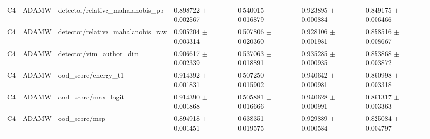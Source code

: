 \begin{longtable}{lllllll}
C4 & ADAMW & detector/relative\_mahalanobis\_pp & 0.898722 $\pm$ 0.002567 & 0.540015 $\pm$ 0.016879 & 0.923895 $\pm$ 0.000884 & 0.849175 $\pm$ 0.006466 \\
C4 & ADAMW & detector/relative\_mahalanobis\_raw & 0.905204 $\pm$ 0.003314 & 0.507806 $\pm$ 0.020360 & 0.928106 $\pm$ 0.001981 & 0.858516 $\pm$ 0.008667 \\
C4 & ADAMW & detector/vim\_author\_dim & 0.906617 $\pm$ 0.002339 & 0.537063 $\pm$ 0.018891 & 0.935285 $\pm$ 0.000935 & 0.853868 $\pm$ 0.003872 \\
C4 & ADAMW & ood\_score/energy\_t1 & 0.914392 $\pm$ 0.001831 & 0.507250 $\pm$ 0.015902 & 0.940642 $\pm$ 0.000981 & 0.860998 $\pm$ 0.003318 \\
C4 & ADAMW & ood\_score/max\_logit & 0.914390 $\pm$ 0.001868 & 0.505881 $\pm$ 0.016666 & 0.940628 $\pm$ 0.000991 & 0.861317 $\pm$ 0.003363 \\
C4 & ADAMW & ood\_score/msp & 0.894918 $\pm$ 0.001451 & 0.638351 $\pm$ 0.019575 & 0.929889 $\pm$ 0.000584 & 0.825084 $\pm$ 0.004797 \\
\end{longtable}
